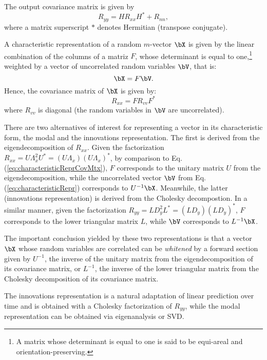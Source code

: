 The output covariance matrix is given by
\begin{equation}
R_{yy} = H R_{xx} H^* + R_{nn},
\label{eq:outputAutocorrelation}
\end{equation}
where a matrix superscript $*$ denotes Hermitian (transpose conjugate).

A characteristic representation of a random $m$-vector $\bX$ is given by the linear combination of the columns of a matriz $F$, whose determinant is equal to one,\footnote{ A matrix whose determinant is equal to one is said to be equi-areal and orientation-preserving.} weighted by a vector of uncorrelated random variables $\bV$, that is:
\begin{equation}
\bX = F\bV.
\label{eq:characteristicRepr}
\end{equation}
Hence, the covariance matrix of $\bX$ is given by:
\begin{equation}
R_{xx} = F R_{vv} F^*
\label{eq:characteristicReprCovMtx}
\end{equation}
where $R_{vv}$ is diagonal (the random variables in $\bV$ are uncorrelated). 

There are two alternatives of interest for representing a vector in its characteristic form, the modal and the innovations representation. The first is derived from the eigendecomposition of $R_{xx}$. Given the factorization $R_{xx} = U \Lambda_x^2 U^* = (U \Lambda_x) (U \Lambda_x)^*$, by comparison to Eq. (\ref{eq:characteristicReprCovMtx}), $F$ corresponds to the unitary matrix $U$ from the eigendecomposition, while the uncorrelated vector $\bV$ from Eq. (\ref{eq:characteristicRepr}) corresponds to $U^{-1} \bX$. Meanwhile, the latter (innovations representation) is derived from the Cholesky decompostion. In a similar manner, given the factorization $R_{yy} = LD_y^2L^* = (LD_y) (LD_y)^*$, $F$ corresponds to the lower triangular matrix $L$, while $\bV$ corresponds to $L^{-1} \bX$.

The important conclusion yielded by these two representations is that a vector $\bX$ whose random variables are correlated can be \textit{whitened} by a forward section given by $U^{-1}$, the inverse of the unitary matrix from the eigendecomposition of its covariance matrix, or $L^{-1}$, the inverse of the lower triangular matrix from the Cholesky decomposition of its covariance matrix.

The innovations representation is a natural adaptation of linear prediction over time and is obtained with a Cholesky factorization of $R_{yy}$, while the modal representation can be obtained via eigenanalysis or SVD.

